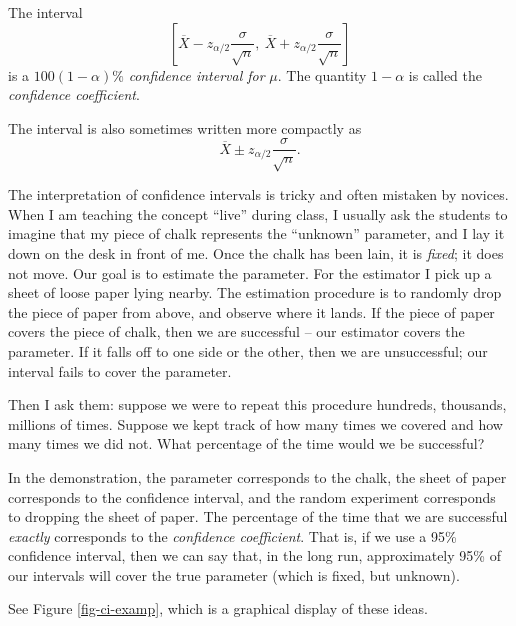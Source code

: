 \documentclass[captions=tableheading]{scrbook}
\begin{document}
\begin{defn}
The interval
\begin{equation}
\left[\overline{X}-z_{\alpha/2}\frac{\sigma}{\sqrt{n}},\ \overline{X}+z_{\alpha/2}\frac{\sigma}{\sqrt{n}}\right]
\end{equation}
is a \(100(1-\alpha)\%\) \emph{confidence interval for} \(\mu\). The quantity \(1-\alpha\) is called the \emph{confidence coefficient}.
\end{defn}

\begin{rem}
The interval is also sometimes written more compactly as
\begin{equation}
\overline{X}\pm z_{\alpha/2}\frac{\sigma}{\sqrt{n}}.\label{eq-z-interval}
\end{equation}
\end{rem}

The interpretation of confidence intervals is tricky and often mistaken by novices. When I am teaching the concept ``live'' during class, I usually ask the students to imagine that my piece of chalk represents the ``unknown'' parameter, and I lay it down on the desk in front of me. Once the chalk has been lain, it is \emph{fixed}; it does not move. Our goal is to estimate the parameter. For the estimator I pick up a sheet of loose paper lying nearby. The estimation procedure is to randomly drop the piece of paper from above, and observe where it lands. If the piece of paper covers the piece of chalk, then we are successful -- our estimator covers the parameter. If it falls off to one side or the other, then we are unsuccessful; our interval fails to cover the parameter.

Then I ask them: suppose we were to repeat this procedure hundreds, thousands, millions of times. Suppose we kept track of how many times we covered and how many times we did not. What percentage of the time would we be successful?

In the demonstration, the parameter corresponds to the chalk, the sheet of paper corresponds to the confidence interval, and the random experiment corresponds to dropping the sheet of paper. The percentage of the time that we are successful \emph{exactly} corresponds to the \emph{confidence coefficient}. That is, if we use a 95\% confidence interval, then we can say that, in the long run, approximately 95\% of our intervals will cover the true parameter (which is fixed, but unknown). 

See Figure \ref{fig-ci-examp}, which is a graphical display of these ideas.
\end{document}
